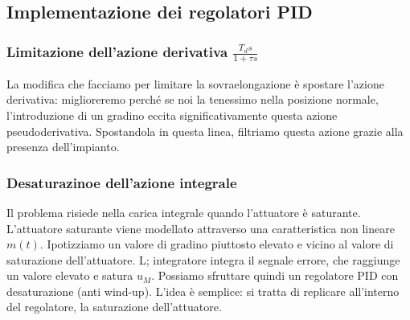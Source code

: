 \documentclass[11pt]{article}
\begin{document}
\subsection{Implementazione dei regolatori PID}
\subsubsection{Limitazione dell'azione derivativa $\frac{T_ds}{1+\tau s}$}
La modifica che facciamo per limitare la sovraelongazione è spostare l'azione derivativa: miglioreremo perché se noi la tenessimo nella posizione normale, l'introduzione di un gradino eccita significativamente questa azione pseudoderivativa. Spostandola in questa linea, filtriamo questa azione grazie alla presenza dell'impianto.
\subsubsection{Desaturazinoe dell'azione integrale}
Il problema risiede nella carica integrale quando l'attuatore è saturante. L'attuatore saturante viene modellato attraverso una caratteristica non lineare $m(t)$. Ipotizziamo un valore di gradino piuttosto elevato e vicino al valore di saturazione dell'attuatore. L; integratore integra il segnale errore, che raggiunge un valore elevato e satura $u_M$. Possiamo sfruttare quindi un regolatore PID con desaturazione (anti wind-up). L'idea è semplice: si tratta di replicare all'interno del regolatore, la saturazione dell'attuatore.
\end{document}
